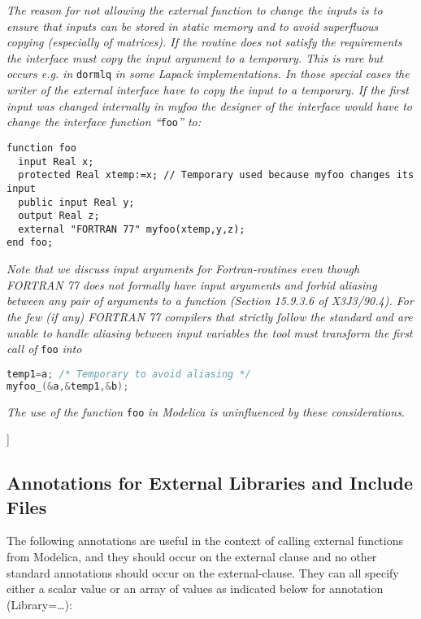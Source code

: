 \emph{The reason for not allowing the external function to change the
inputs is to ensure that inputs can be stored in static memory and to
avoid superfluous copying (especially of matrices). If the routine does
not satisfy the requirements the interface must copy the input argument
to a temporary. This is rare but occurs e.g. in} \lstinline!dormlq! \emph{in some
Lapack implementations. In those special cases the writer of the
external interface have to copy the input to a temporary. If the first
input was changed internally in myfoo the designer of the interface
would have to change the interface function ``}\lstinline!foo!\emph{'' to:}

\begin{lstlisting}[language=modelica]
function foo
  input Real x;
  protected Real xtemp:=x; // Temporary used because myfoo changes its input
  public input Real y;
  output Real z;
  external "FORTRAN 77" myfoo(xtemp,y,z);
end foo;
\end{lstlisting}

\emph{Note that we discuss input arguments for Fortran-routines even
though FORTRAN 77 does not formally have input arguments and forbid
aliasing between any pair of arguments to a function (Section 15.9.3.6
of X3J3/90.4). For the few (if any) FORTRAN 77 compilers that strictly
follow the standard and are unable to handle aliasing between input
variables the tool must transform the first call of} \lstinline!foo! \emph{into}
\begin{lstlisting}[language=C]
temp1=a; /* Temporary to avoid aliasing */
myfoo_(&a,&temp1,&b);
\end{lstlisting}

\emph{The use of the function} \lstinline!foo! \emph{in Modelica is uninfluenced by
these considerations.}

{]}

\subsection{Annotations for External Libraries and Include Files}

The following annotations are useful in the context of calling external
functions from Modelica, and they should occur on the external clause
and no other standard annotations should occur on the external-clause.
They can all specify either a scalar value or an array of values as
indicated below for annotation (Library=\ldots{}):

